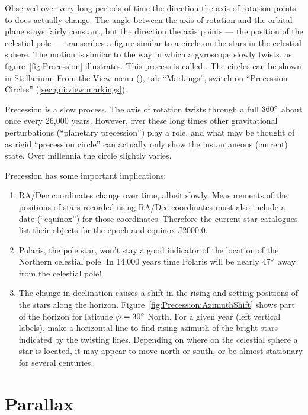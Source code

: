 Observed over very long periods of time the direction the axis of
rotation points to does actually change. The angle between the axis of
rotation and the orbital plane stays fairly constant, but the
direction the axis points --- the position of the celestial pole ---
transcribes a figure similar to a circle on the stars in the celestial sphere. The motion
is similar to the way in which a gyroscope slowly twists, as
figure~\ref{fig:Precession} illustrates. This process is called
. The circles can be shown in Stellarium: From
the View menu (), tab ``Markings'', switch on ``Precession
Circles'' (\ref{sec:gui:view:markings}).

Precession is a slow process. The axis of rotation twists through a
full $360\degree$ about once every 26,000 years. However, over these
long times other gravitational perturbations (``planetary
precession'') play a role, and what may be thought of as rigid
``precession circle'' can actually only show the instantaneous
(current) state. Over millennia the circle slightly varies.

Precession has some important implications:

\begin{enumerate}
\item RA/Dec coordinates change over time, albeit slowly. Measurements
  of the positions of stars recorded using RA/Dec coordinates must
  also include a date (``equinox'') for those coordinates. Therefore
  the current star catalogues list their objects for the epoch and
  equinox J2000.0.
\item Polaris, the pole star, won't stay a good indicator of the
  location of the Northern celestial pole. In 14,000 years time
  Polaris will be nearly $47\degree$ away from the celestial pole!
\item The change in declination causes a shift in the rising and
  setting positions of the stars along the
  horizon. Figure~\ref{fig:Precession:AzimuthShift} shows part of the
  horizon for latitude $\varphi=30\degree$ North. For a given year
  (left vertical labels), make a horizontal line to find rising
  azimuth of the bright stars indicated by the twisting
  lines. Depending on where on the celestial sphere a star is located,
  it may appear to move north or south, or be almost stationary for
  several centuries.
\end{enumerate}


\section{Parallax}
\label{sec:Concepts:Parallax}


